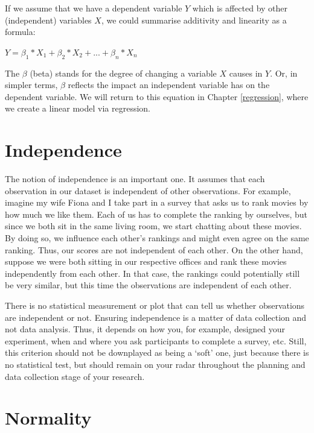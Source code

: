 \documentclass[
]{book}
\begin{document}
If we assume that we have a dependent variable \(Y\) which is affected by other (independent) variables \(X\), we could summarise additivity and linearity as a formula:

\leavevmode\hypertarget{linearity_additivity-formula}{}%
\(Y = \beta_{1} * X_1 + \beta_{2} * X_{2} + ... + \beta_{n} * X_{n}\)

The \(\beta\) (beta) stands for the degree of changing a variable \(X\) causes in \(Y\). Or, in simpler terms, \(\beta\) reflects the impact an independent variable has on the dependent variable. We will return to this equation in Chapter \ref{regression}, where we create a linear model via regression.

\hypertarget{independence}{%
\section{Independence}\label{independence}}

The notion of independence is an important one. It assumes that each observation in our dataset is independent of other observations. For example, imagine my wife Fiona and I take part in a survey that asks us to rank movies by how much we like them. Each of us has to complete the ranking by ourselves, but since we both sit in the same living room, we start chatting about these movies. By doing so, we influence each other's rankings and might even agree on the same ranking. Thus, our scores are not independent of each other. On the other hand, suppose we were both sitting in our respective offices and rank these movies independently from each other. In that case, the rankings could potentially still be very similar, but this time the observations are independent of each other.

There is no statistical measurement or plot that can tell us whether observations are independent or not. Ensuring independence is a matter of data collection and not data analysis. Thus, it depends on how you, for example, designed your experiment, when and where you ask participants to complete a survey, etc. Still, this criterion should not be downplayed as being a `soft' one, just because there is no statistical test, but should remain on your radar throughout the planning and data collection stage of your research.

\hypertarget{normality}{%
\section{Normality}\label{normality}}
\end{document}
